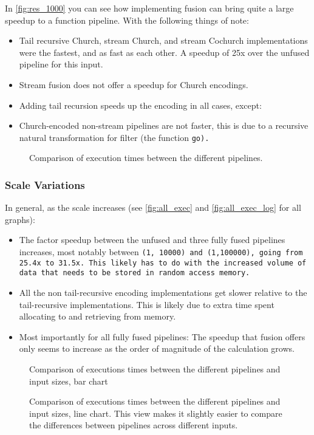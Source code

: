 In \autoref{fig:res_1000} you can see how implementing fusion can bring quite a large speedup to a function pipeline.
With the following things of note:
\begin{itemize}[noitemsep]
    \item Tail recursive Church, stream Church, and stream Cochurch implementations were the fastest, and as fast as each other. A speedup of 25x over the unfused pipeline for this input.
    \item Stream fusion does not offer a speedup for Church encodings.
    \item Adding tail recursion speeds up the encoding in all cases, except:
    \item Church-encoded non-stream pipelines are not faster, this is due to a recursive natural transformation for filter (the function \tt{go}).
\end{itemize}

\begin{figure}[h]
    
    \caption{Comparison of execution times between the different pipelines.}
    \label{fig:res_1000}
\end{figure}

\subsubsection{Scale Variations}\label{sec:scale_var}
In general, as the scale increases (see \autoref{fig:all_exec} and \autoref{fig:all_exec_log} for all graphs):
\begin{itemize}[noitemsep]
    \item The factor speedup between the unfused and three fully fused pipelines increases, most notably between \tt{(1, 10000)} and \tt{(1,100000)}, going from 25.4x to 31.5x.
    This likely has to do with the increased volume of data that needs to be stored in random access memory.
    \item All the non tail-recursive encoding implementations get slower relative to the tail-recursive implementations.
    This is likely due to extra time spent allocating to and retrieving from memory.
    \item Most importantly for all fully fused pipelines: The speedup that fusion offers only seems to increase as the order of magnitude of the calculation grows.
\end{itemize}

\begin{figure}[H]
    \centering
    
    \caption{Comparison of executions times between the different pipelines and input sizes, bar chart}
    \label{fig:results1}
\end{figure}
\begin{figure}[H]
    \centering
    
    \caption{Comparison of executions times between the different pipelines and input sizes, line chart. This view makes it slightly easier to compare the differences between pipelines across different inputs.}
    \label{fig:results2}
\end{figure}
